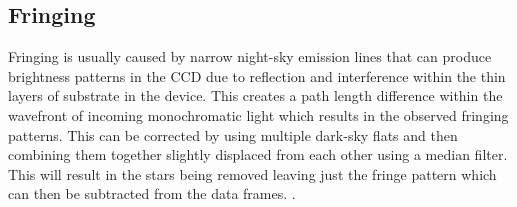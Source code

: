 \documentclass{article}
\begin{document}
\subsection{Fringing}
Fringing is usually caused by narrow night-sky emission lines that can produce brightness patterns in the CCD due to reflection and interference within the thin layers of substrate in the device. This creates a path length difference within the wavefront of incoming monochromatic light which results in the observed fringing patterns. This can be corrected by using multiple dark-sky flats and then combining them together slightly displaced from each other using a median filter. This will result in the stars being removed leaving just the fringe pattern which can then be subtracted from the data frames.
. 
\end{document}
